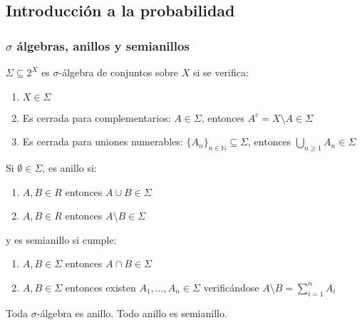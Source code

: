\subsection{Introducción a la probabilidad}
 \begin{frame}\frametitle{$\sigma$ álgebras, anillos y semianillos}
  \begin{definition}
   $\Sigma \subseteq 2^X$ es $\sigma$-álgebra de conjuntos sobre $X$ si se verifica:
   
   \begin{enumerate}[i]
    \item $X \in \Sigma$
    \item Es cerrada para complementarios: $A\in \Sigma$, entonces $A^c = X\setminus A \in \Sigma$
    \item Es cerrada para uniones numerables: $\{A_n\}_{n\in\mathbb{N}} \subseteq \Sigma$, entonces 
    $\underset{n \ge 1}{\bigcup} A_n \in \Sigma$
   \end{enumerate}
   
   Si $\emptyset \in \Sigma$, es anillo si:
   \begin{enumerate}[i]
    \item $A,B \in R$ entonces $A\cup B \in \Sigma$
    \item $A,B \in R$ entonces $A\setminus B \in \Sigma$
   \end{enumerate}

   y es semianillo si cumple:
   \begin{enumerate}[i]
    \item $A,B \in \Sigma$ entonces $A\cap B \in \Sigma$
    \item $A,B \in \Sigma$ entonces existen $A_1, \ldots, A_n \in \Sigma$ verificándose $A\setminus B = \sum_{i=1}^n A_i$
   \end{enumerate}
  \end{definition}

  \begin{fact}
  Toda $\sigma$-álgebra es anillo. Todo anillo es semianillo.
  \end{fact}
 \end{frame}
 
